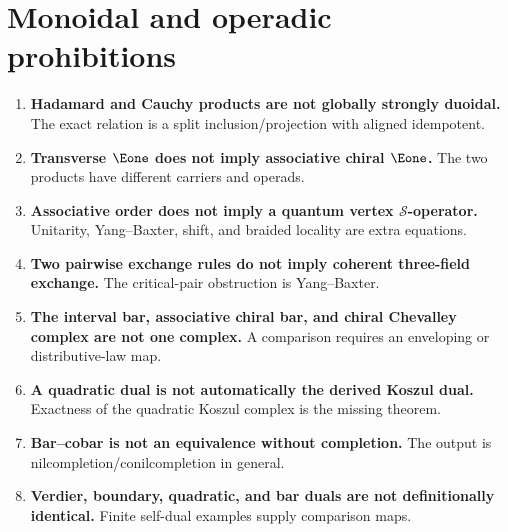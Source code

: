 \section{Monoidal and operadic prohibitions}
\begin{enumerate}[resume*=nogo,label=\textbf{N\arabic*.}]
\item \textbf{Hadamard and Cauchy products are not globally strongly duoidal.}  The exact relation is a split inclusion/projection with aligned idempotent.
\item \textbf{Transverse \(\Eone\) does not imply associative chiral \(\Eone\).}  The two products have different carriers and operads.
\item \textbf{Associative order does not imply a quantum vertex \(\mathcal S\)-operator.}  Unitarity, Yang--Baxter, shift, and braided locality are extra equations.
\item \textbf{Two pairwise exchange rules do not imply coherent three-field exchange.}  The critical-pair obstruction is Yang--Baxter.
\item \textbf{The interval bar, associative chiral bar, and chiral Chevalley complex are not one complex.}  A comparison requires an enveloping or distributive-law map.
\item \textbf{A quadratic dual is not automatically the derived Koszul dual.}  Exactness of the quadratic Koszul complex is the missing theorem.
\item \textbf{Bar--cobar is not an equivalence without completion.}  The output is nilcompletion/conilcompletion in general.
\item \textbf{Verdier, boundary, quadratic, and bar duals are not definitionally identical.}  Finite self-dual examples supply comparison maps.
\end{enumerate}

